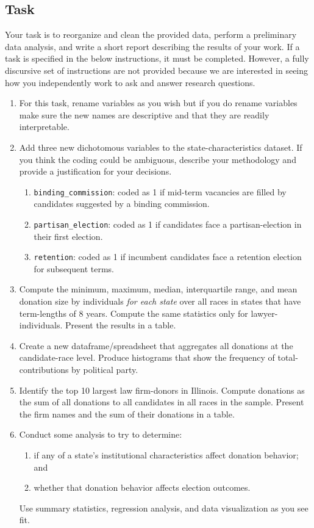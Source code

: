\documentclass[11pt, letterpaper, twoside]{article}
\begin{document}
\subsection*{Task}

Your task is to reorganize and clean the provided data, perform a preliminary data analysis, and write a short report describing the results of your work. If a task is specified in the below instructions, it must be completed. However, a fully discursive set of instructions are not provided because we are interested in seeing how you independently work to ask and answer research questions.

\begin{enumerate}
    \item For this task, rename variables as you wish but if you do rename variables make sure the new names are descriptive and that they are readily interpretable. 
    \item Add three new dichotomous variables to the state-characteristics dataset. If you think the coding could be ambiguous, describe your methodology and provide a justification for your decisions.
    \begin{enumerate}[label=\alph*.]
        \item \verb|binding_commission|: coded as 1 if mid-term vacancies are filled by candidates suggested by a binding commission.
        \item \verb|partisan_election|: coded as 1 if candidates face a partisan-election in their first election. 
        \item \verb|retention|: coded as 1 if incumbent candidates face a retention election for subsequent terms.
    \end{enumerate}
    \item Compute the minimum, maximum, median, interquartile range, and mean donation size by individuals \textit{for each state} over all races in states that have term-lengths of 8 years. Compute the same statistics only for lawyer-individuals. Present the results in a table. 
    \item Create a new dataframe/spreadsheet that aggregates all donations at the candidate-race level. Produce histograms that show the frequency of total-contributions by political party.
    \item Identify the top 10 largest law firm-donors in Illinois. Compute donations as the sum of all donations to all candidates in all races in the sample. Present the firm names and the sum of their donations in a table.
    \item Conduct some analysis to try to determine:
    \begin{enumerate}[label=\alph*.]
        \item if any of a state's institutional characteristics affect donation behavior; and 
        \item whether that donation behavior affects election outcomes.
    \end{enumerate}
    Use summary statistics, regression analysis, and data visualization as you see fit.
\end{enumerate}
\end{document}
